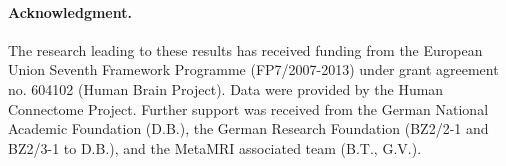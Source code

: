 \documentclass{article}
\begin{document}
\paragraph{Acknowledgment.}
{\small The research leading to these results has received funding from the
European Union Seventh Framework Programme (FP7/2007-2013)
under grant agreement no. 604102 (Human Brain Project).
Data were provided by the Human Connectome Project.
Further support was received from
the German National Academic Foundation (D.B.),
the German Research Foundation (BZ2/2-1 and BZ2/3-1 to D.B.),
and the MetaMRI associated team (B.T., G.V.).
}

  
\small
% 


\end{document}
